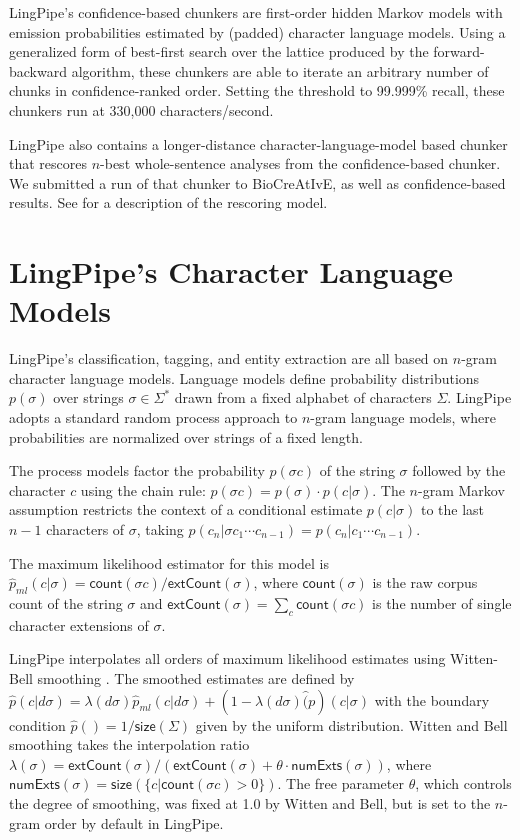 \documentclass[twoside,11pt]{article}
\begin{document}
LingPipe's confidence-based chunkers are first-order hidden Markov
models with emission probabilities estimated by (padded) character
language models.  Using a generalized form of best-first search over
the lattice produced by the forward-backward algorithm, these
chunkers are able to iterate an arbitrary number of chunks in
confidence-ranked order.  Setting the threshold to 99.999\% recall,
these chunkers run at 330,000 characters/second.

LingPipe also contains a longer-distance character-language-model
based chunker that rescores $n$-best whole-sentence analyses from
the confidence-based chunker.  We submitted a run of that
chunker to BioCreAtIvE, as well as confidence-based results.
See \cite{carpenter-sighan} for a description of the rescoring model.


\section{LingPipe's Character Language Models}

LingPipe's classification, tagging, and entity extraction are all
based on $n$-gram character language models.  Language models define
probability distributions $p(\sigma)$ over strings $\sigma \in
\Sigma^*$ drawn from a fixed alphabet of characters $\Sigma$.
LingPipe adopts a standard random process approach to $n$-gram
language models, where probabilities are normalized over strings of a fixed
length.

The process models factor the probability $p(\sigma c)$ of the string
$\sigma$ followed by the character $c$ using the chain rule: $p(\sigma
c) = p(\sigma) \cdot p(c | \sigma)$.  The $n$-gram Markov assumption
restricts the context of a conditional estimate $p(c | \sigma)$ to the
last $n-1$ characters of $\sigma$, taking $p(c_n | \sigma c_1 \cdots
c_{n-1}) = p(c_n|c_1 \cdots c_{n-1})$.

The maximum likelihood estimator for this model is $\hat{p}_{ml}(c |
\sigma) = \mathsf{count}(\sigma c) / \mathsf{extCount}(\sigma)$, where
$\mathsf{count}(\sigma)$ is the raw corpus count of the string
$\sigma$ and $\mathsf{extCount}(\sigma) = \sum_c \mathsf{count}(\sigma
c)$ is the number of single character extensions of $\sigma$.

LingPipe interpolates all orders of maximum likelihood estimates using
Witten-Bell smoothing \cite{manning}. The smoothed
estimates are defined by $\hat{p}(c | d \sigma) = \lambda(d\sigma)
\hat{p}_{ml}(c | d
\sigma) + (1 - \lambda(d\sigma) \hat(p)(c | \sigma)$ with the boundary
condition $\hat{p}() = 1 / \mathsf{size}(\Sigma)$ given by the uniform
distribution.  Witten and Bell smoothing takes the interpolation ratio
$\lambda(\sigma) = \mathsf{extCount}(\sigma) /
(\mathsf{extCount}(\sigma) + \theta \cdot \mathsf{numExts}(\sigma))$,
where $\mathsf{numExts}(\sigma) =
\mathsf{size}(\{ c | \mathsf{count}(\sigma c) > 0 \})$.
The free parameter $\theta$, which controls the degree of smoothing,
was fixed at 1.0 by Witten and Bell, but is set to the $n$-gram order
by default in LingPipe.
\end{document}
